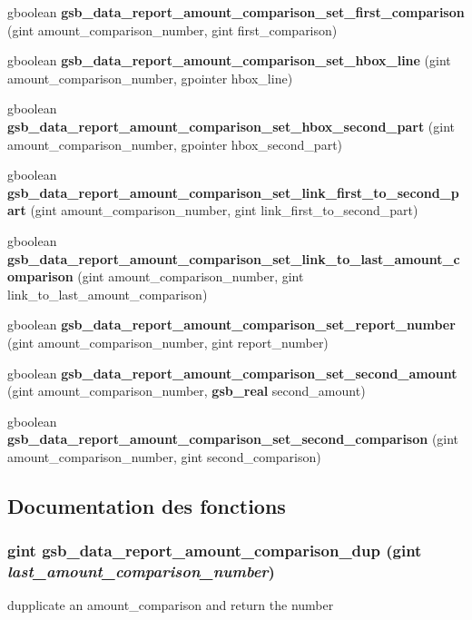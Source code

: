 \begin{DoxyCompactItemize}
\item 
gboolean {\bf gsb\_\-data\_\-report\_\-amount\_\-comparison\_\-set\_\-first\_\-comparison} (gint amount\_\-comparison\_\-number, gint first\_\-comparison)
\item 
gboolean {\bf gsb\_\-data\_\-report\_\-amount\_\-comparison\_\-set\_\-hbox\_\-line} (gint amount\_\-comparison\_\-number, gpointer hbox\_\-line)
\item 
gboolean {\bf gsb\_\-data\_\-report\_\-amount\_\-comparison\_\-set\_\-hbox\_\-second\_\-part} (gint amount\_\-comparison\_\-number, gpointer hbox\_\-second\_\-part)
\item 
gboolean {\bf gsb\_\-data\_\-report\_\-amount\_\-comparison\_\-set\_\-link\_\-first\_\-to\_\-second\_\-part} (gint amount\_\-comparison\_\-number, gint link\_\-first\_\-to\_\-second\_\-part)
\item 
gboolean {\bf gsb\_\-data\_\-report\_\-amount\_\-comparison\_\-set\_\-link\_\-to\_\-last\_\-amount\_\-comparison} (gint amount\_\-comparison\_\-number, gint link\_\-to\_\-last\_\-amount\_\-comparison)
\item 
gboolean {\bf gsb\_\-data\_\-report\_\-amount\_\-comparison\_\-set\_\-report\_\-number} (gint amount\_\-comparison\_\-number, gint report\_\-number)
\item 
gboolean {\bf gsb\_\-data\_\-report\_\-amount\_\-comparison\_\-set\_\-second\_\-amount} (gint amount\_\-comparison\_\-number, {\bf gsb\_\-real} second\_\-amount)
\item 
gboolean {\bf gsb\_\-data\_\-report\_\-amount\_\-comparison\_\-set\_\-second\_\-comparison} (gint amount\_\-comparison\_\-number, gint second\_\-comparison)
\end{DoxyCompactItemize}


\subsection{Documentation des fonctions}
\subsubsection[{gsb\_\-data\_\-report\_\-amount\_\-comparison\_\-dup}]{\setlength{\rightskip}{0pt plus 5cm}gint gsb\_\-data\_\-report\_\-amount\_\-comparison\_\-dup (gint {\em last\_\-amount\_\-comparison\_\-number})}\label{gsb__data__report__amout__comparison_8h_ac710856ddf27a344cd4f12923b9c6194}
dupplicate an amount\_\-comparison and return the number


